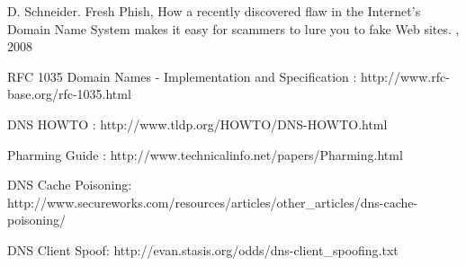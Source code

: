 \begin{thebibliography}{10}

\newblock D. Schneider.
\newblock Fresh Phish, How a recently discovered flaw in the Internet's Domain Name
System makes it easy for scammers to lure you to fake Web sites.
, 2008  

RFC 1035 Domain Names - Implementation and Specification :
\newblock http://www.rfc-base.org/rfc-1035.html

DNS HOWTO :
\newblock http://www.tldp.org/HOWTO/DNS-HOWTO.html

Pharming Guide :
\newblock http://www.technicalinfo.net/papers/Pharming.html

DNS Cache Poisoning:
\newblock http://www.secureworks.com/resources/articles/other\_articles/dns-cache-poisoning/

DNS Client Spoof:
\newblock http://evan.stasis.org/odds/dns-client\_spoofing.txt


\end{thebibliography}







